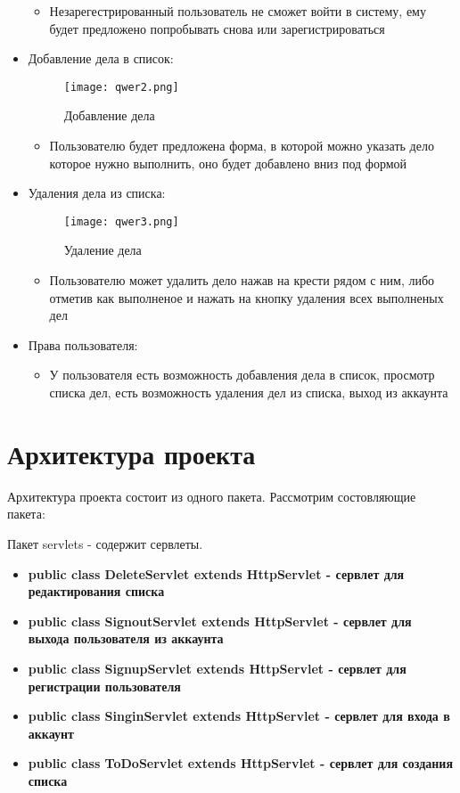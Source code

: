 \documentclass[a4paper,14pt]{extarticle} %
\begin{document}
\begin{itemize}
    \begin{itemize}
        \item{Незарегестрированный пользователь не сможет войти в систему, ему будет предложено попробывать снова или зарегистрироваться}
    \end{itemize}
    \item{Добавление дела в список:} 
    \begin{figure}[H]
        \centering\texttt{[image: qwer2.png]}
        \caption{Добавление дела}
    \end{figure}
    \begin{itemize} 
        \item{Пользователю будет предложена форма, в которой можно указать дело которое нужно выполнить, оно будет добавлено вниз под формой} 
    \end{itemize}
    \item{Удаления дела из списка:}
    \begin{figure}[H]
        \centering\texttt{[image: qwer3.png]}
        \caption{Удаление дела}
    \end{figure}
    \begin{itemize} 
        \item{Пользователю может удалить дело нажав на крести рядом с ним, либо отметив как выполненое и нажать на кнопку удаления всех выполненых дел} 
    \end{itemize}
 \item{Права пользователя:}
    \begin{itemize}
        \item{У пользователя есть возможность добавления дела в список, просмотр списка дел,  есть возможность удаления дел из списка, выход из аккаунта}
    \end{itemize}
\end{itemize}
\newpage
\section{Архитектура проекта}
Архитектура проекта состоит из одного пакета. Рассмотрим состовляющие пакета:
    \item {Пакет servlets - содержит сервлеты.}
    \begin{itemize}
        \item\bf{public class DeleteServlet extends HttpServlet} - сервлет для редактирования списка 
        \item\bf{public class SignoutServlet extends HttpServlet} - сервлет для выхода пользователя из аккаунта
        \item\bf{public class SignupServlet extends HttpServlet} - сервлет для регистрации пользователя 
        \item\bf{public class SinginServlet extends HttpServlet} - сервлет для входа в аккаунт
        \item\bf{public class ToDoServlet extends HttpServlet} - сервлет для создания списка
    \end{itemize}
\end{document}
